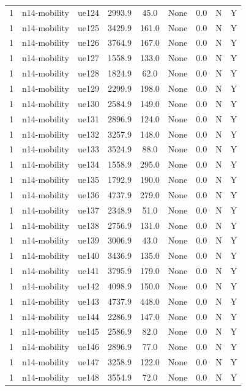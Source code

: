 \begin{table}[ht]
\begin{tabular}{|c|c|c|c|c|c|c|c|c|}
1 & n14-mobility & ue124 & 2993.9 & 45.0 & None & 0.0 & N & Y \\
1 & n14-mobility & ue125 & 3429.9 & 161.0 & None & 0.0 & N & Y \\
1 & n14-mobility & ue126 & 3764.9 & 167.0 & None & 0.0 & N & Y \\
1 & n14-mobility & ue127 & 1558.9 & 133.0 & None & 0.0 & N & Y \\
1 & n14-mobility & ue128 & 1824.9 & 62.0 & None & 0.0 & N & Y \\
1 & n14-mobility & ue129 & 2299.9 & 198.0 & None & 0.0 & N & Y \\
1 & n14-mobility & ue130 & 2584.9 & 149.0 & None & 0.0 & N & Y \\
1 & n14-mobility & ue131 & 2896.9 & 124.0 & None & 0.0 & N & Y \\
1 & n14-mobility & ue132 & 3257.9 & 148.0 & None & 0.0 & N & Y \\
1 & n14-mobility & ue133 & 3524.9 & 88.0 & None & 0.0 & N & Y \\
1 & n14-mobility & ue134 & 1558.9 & 295.0 & None & 0.0 & N & Y \\
1 & n14-mobility & ue135 & 1792.9 & 190.0 & None & 0.0 & N & Y \\
1 & n14-mobility & ue136 & 4737.9 & 279.0 & None & 0.0 & N & Y \\
1 & n14-mobility & ue137 & 2348.9 & 51.0 & None & 0.0 & N & Y \\
1 & n14-mobility & ue138 & 2756.9 & 131.0 & None & 0.0 & N & Y \\
1 & n14-mobility & ue139 & 3006.9 & 43.0 & None & 0.0 & N & Y \\
1 & n14-mobility & ue140 & 3436.9 & 135.0 & None & 0.0 & N & Y \\
1 & n14-mobility & ue141 & 3795.9 & 179.0 & None & 0.0 & N & Y \\
1 & n14-mobility & ue142 & 4098.9 & 150.0 & None & 0.0 & N & Y \\
1 & n14-mobility & ue143 & 4737.9 & 448.0 & None & 0.0 & N & Y \\
1 & n14-mobility & ue144 & 2286.9 & 147.0 & None & 0.0 & N & Y \\
1 & n14-mobility & ue145 & 2586.9 & 82.0 & None & 0.0 & N & Y \\
1 & n14-mobility & ue146 & 2896.9 & 77.0 & None & 0.0 & N & Y \\
1 & n14-mobility & ue147 & 3258.9 & 122.0 & None & 0.0 & N & Y \\
1 & n14-mobility & ue148 & 3554.9 & 72.0 & None & 0.0 & N & Y \\

\end{tabular}
\end{table}
